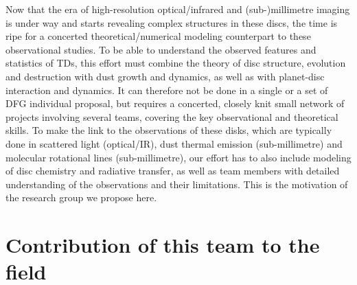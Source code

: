 \documentclass[12pt]{article}
\begin{document}
  Now that the
  era of high-resolution optical/infrared and (sub-)millimetre imaging is
  under way and starts revealing complex structures in these discs, the time
  is ripe for a concerted theoretical/numerical modeling counterpart to
  these observational studies. To be able to understand the observed
  features and statistics of TDs, this effort must combine the
  theory of disc structure, evolution and destruction with dust growth and
  dynamics, as well as with planet-disc interaction and dynamics. It can
  therefore not be done in a single or a set of DFG individual proposal, but
  requires a concerted, closely knit small network of projects involving
  several teams, covering the key observational and theoretical
  skills. To make the link to the observations of these disks, 
  which are typically done in scattered light (optical/IR), dust thermal
  emission (sub-millimetre) and molecular rotational lines (sub-millimetre),
  our effort has to also include modeling of disc chemistry and radiative
  transfer, as well as team members with detailed understanding of the
  observations and their limitations. This is the motivation of the research
  group we propose here.


\section*{Contribution of this team to the field }
%
\end{document}
